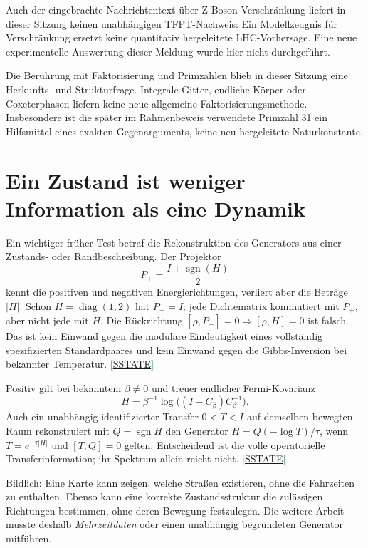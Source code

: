 \documentclass[11pt,a4paper,oneside,parskip=half,headings=normal,numbers=noenddot,bibliography=totoc]{scrreprt}
\newcommand{\src}[1]{\textcolor{teal}{\small[\hyperref[s:#1]{S#1}]}}
\begin{document}
Auch der eingebrachte Nachrichtentext über Z-Boson-Verschränkung liefert in dieser Sitzung keinen unabhängigen TFPT-Nachweis: Ein Modellzeugnis für Verschränkung ersetzt keine quantitativ hergeleitete LHC-Vorhersage. Eine neue experimentelle Auswertung dieser Meldung wurde hier nicht durchgeführt.

Die Berührung mit Faktorisierung und Primzahlen blieb in dieser Sitzung eine Herkunfts- und Strukturfrage. Integrale Gitter, endliche Körper oder Coxeterphasen liefern keine neue allgemeine Faktorisierungsmethode. Insbesondere ist die später im Rahmenbeweis verwendete Primzahl 31 ein Hilfsmittel eines exakten Gegenarguments, keine neu hergeleitete Naturkonstante.

\section{Ein Zustand ist weniger Information als eine Dynamik}
Ein wichtiger früher Test betraf die Rekonstruktion des Generators aus einer Zustands- oder Randbeschreibung. Der Projektor
\[
 P_+=\frac{I+\operatorname{sgn}(H)}2
\]
kennt die positiven und negativen Energierichtungen, verliert aber die Beträge $|H|$. Schon $H=\operatorname{diag}(1,2)$ hat $P_+=I$; jede Dichtematrix kommutiert mit $P_+$, aber nicht jede mit $H$. Die Rückrichtung $[\rho,P_+]=0\Rightarrow[\rho,H]=0$ ist falsch. Das ist kein Einwand gegen die modulare Eindeutigkeit eines vollständig spezifizierten Standardpaares und kein Einwand gegen die Gibbs-Inversion bei bekannter Temperatur. \src{STATE}

Positiv gilt bei bekanntem $\beta\ne0$ und treuer endlicher Fermi-Kovarianz
\[
 H=\beta^{-1}\log\bigl((I-C_\beta)C_\beta^{-1}\bigr).
\]
Auch ein unabhängig identifizierter Transfer $0<T<I$ auf demselben bewegten Raum rekonstruiert mit $Q=\operatorname{sgn}H$ den Generator $H=Q(-\log T)/\tau$, wenn $T=e^{-\tau|H|}$ und $[T,Q]=0$ gelten. Entscheidend ist die volle operatorielle Transferinformation; ihr Spektrum allein reicht nicht. \src{STATE}

Bildlich: Eine Karte kann zeigen, welche Straßen existieren, ohne die Fahrzeiten zu enthalten. Ebenso kann eine korrekte Zustandsstruktur die zulässigen Richtungen bestimmen, ohne deren Bewegung festzulegen. Die weitere Arbeit musste deshalb \emph{Mehrzeitdaten} oder einen unabhängig begründeten Generator mitführen.
\end{document}
